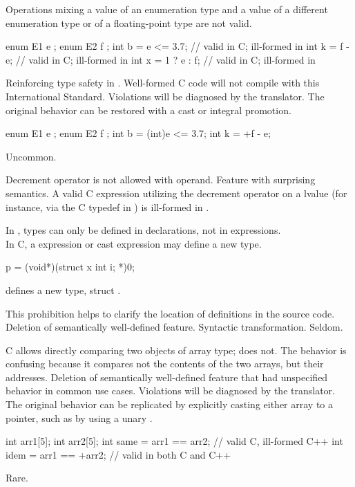 \change
Operations mixing a value of an enumeration type and a value of a different
enumeration type or of a floating-point type are not valid.
\begin{example}
\begin{codeblock}
enum E1 { e };
enum E2 { f };
int b = e <= 3.7;       // valid in C; ill-formed in \Cpp{}
int k = f - e;          // valid in C; ill-formed in \Cpp{}
int x = 1 ? e : f;      // valid in C; ill-formed in \Cpp{}
\end{codeblock}
\end{example}
\rationale
Reinforcing type safety in \Cpp{}.
\effect
Well-formed C code will not compile with this International Standard.
\difficulty
Violations will be diagnosed by the \Cpp{} translator.
The original behavior can be restored with a cast or integral promotion.
\begin{example}
\begin{codeblock}
enum E1 { e };
enum E2 { f };
int b = (int)e <= 3.7;
int k = +f - e;
\end{codeblock}
\end{example}
\howwide
Uncommon.

\change
Decrement operator is not allowed with  operand.
\rationale
Feature with surprising semantics.
\effect
A valid C expression utilizing the decrement operator on
a  lvalue
(for instance, via the C typedef in )
is ill-formed in \Cpp{}.

\change
In \Cpp{}, types can only be defined in declarations, not in expressions.\\
In C, a  expression or cast expression may define a new type.
\begin{example}
\begin{codeblock}
p = (void*)(struct x {int i;} *)0;
\end{codeblock}
defines a new type, struct .
\end{example}
\rationale
This prohibition helps to clarify the location of
definitions in the source code.
\effect
Deletion of semantically well-defined feature.
\difficulty
Syntactic transformation.
\howwide
Seldom.

\change
C allows directly comparing two objects of array type; \Cpp{} does not.
\rationale
The behavior is confusing because it compares not the contents of the two
arrays, but their addresses.
\effect
Deletion of semantically well-defined feature that had unspecified behavior
in common use cases.
\difficulty
Violations will be diagnosed by the \Cpp{} translator. The original behavior
can be replicated by explicitly casting either array to a pointer, such as by
using a unary \tcode{+}.
\begin{example}
\begin{codeblock}
int arr1[5];
int arr2[5];
int same = arr1 == arr2;        // valid C, ill-formed C++
int idem = arr1 == +arr2;       // valid in both C and C++
\end{codeblock}
\end{example}
\howwide
Rare.

